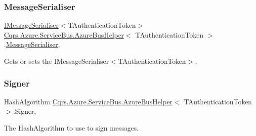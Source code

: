 \subsubsection{\texorpdfstring{Message\+Serialiser}{MessageSerialiser}}
{\footnotesize\ttfamily \hyperlink{interfaceCqrs_1_1Azure_1_1ServiceBus_1_1IMessageSerialiser}{I\+Message\+Serialiser}$<$T\+Authentication\+Token$>$ \hyperlink{classCqrs_1_1Azure_1_1ServiceBus_1_1AzureBusHelper}{Cqrs.\+Azure.\+Service\+Bus.\+Azure\+Bus\+Helper}$<$ T\+Authentication\+Token $>$.\hyperlink{classCqrs_1_1Azure_1_1ServiceBus_1_1MessageSerialiser}{Message\+Serialiser}\hspace{0.3cm}{\ttfamily [get]}, {\ttfamily [protected]}}



Gets or sets the I\+Message\+Serialiser$<$\+T\+Authentication\+Token$>$. 

\mbox{\label{classCqrs_1_1Azure_1_1ServiceBus_1_1AzureBusHelper_ae01bc83b9283d35b4ecf3087503846d1_ae01bc83b9283d35b4ecf3087503846d1}} 
\subsubsection{\texorpdfstring{Signer}{Signer}}
{\footnotesize\ttfamily Hash\+Algorithm \hyperlink{classCqrs_1_1Azure_1_1ServiceBus_1_1AzureBusHelper}{Cqrs.\+Azure.\+Service\+Bus.\+Azure\+Bus\+Helper}$<$ T\+Authentication\+Token $>$.Signer\hspace{0.3cm}{\ttfamily [get]}, {\ttfamily [protected]}}



The Hash\+Algorithm to use to sign messages. 

